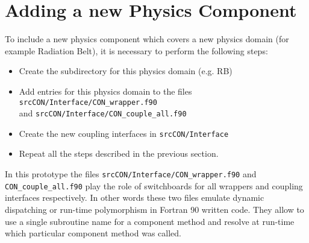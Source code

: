 \section{Adding a new Physics Component}

To include a new physics component which covers a new physics domain
(for example Radiation Belt), it is necessary to perform the following steps:
\begin{itemize}
\item Create the subdirectory for this physics domain (e.g. RB) 
\item Add entries for this physics domain to the 
      files {\tt srcCON/Interface/CON\_wrapper.f90} \\
      and {\tt srcCON/Interface/CON\_couple\_all.f90}
\item Create the new coupling interfaces in {\tt srcCON/Interface}
\item Repeat all the steps described in the previous section.
\end{itemize}
In this prototype the files {\tt srcCON/Interface/CON\_wrapper.f90} and 
{\tt CON\_couple\_all.f90} play the role 
of switchboards for all wrappers and coupling interfaces respectively. 
In other words these two files emulate dynamic dispatching or run-time 
polymorphism in Fortran 90 written code. They allow to use a single
subroutine name for a component method and resolve at run-time which 
particular component method was called.

%
